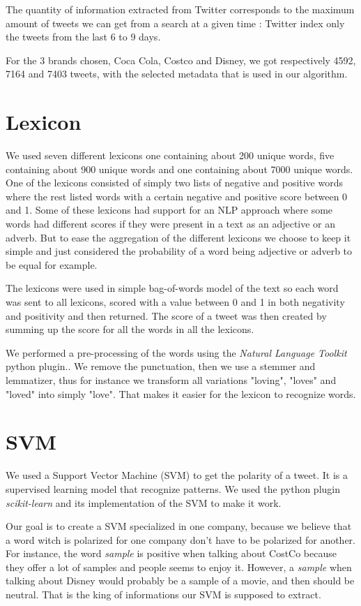 \documentclass[a4paper,12pt]{report}
\begin{document}
The quantity of information extracted from Twitter corresponds to the maximum amount of tweets we can get from a search at a given time : Twitter index only the tweets from the last 6 to 9 days.

For the 3 brands chosen, Coca Cola, Costco and Disney, we got respectively 4592, 7164 and 7403 tweets, with the selected metadata that is used in our algorithm.

\section{Lexicon}

We used seven different lexicons one containing about 200 unique words, five containing about 900 unique words and one containing about 7000 unique words.
One of the lexicons consisted of simply two lists of negative and positive words where the rest listed words with a certain negative and positive score between 0 and 1. 
Some of these lexicons had support for an NLP approach where some words had different scores if they were present in a text as an adjective or an adverb.  
But to ease the aggregation of the different lexicons we choose to keep it simple and just considered the probability of a word being adjective or adverb to be equal for example.

The lexicons were used in simple bag-of-words model of the text so each word was sent to all lexicons, scored with a value between 0 and 1 in both negativity and positivity and then returned. 
The score of a tweet was then created by summing up the score for all the words in all the lexicons.

We performed a pre-processing of the words using the \textit{Natural Language Toolkit} python plugin.\cite{NLTK}.
We remove the punctuation, then we use a stemmer and lemmatizer, thus for instance we transform all variations "loving", "loves" and "loved" into simply "love".
That makes it easier for the lexicon to recognize words.

\section{SVM}

We used a Support Vector Machine (SVM) to get the polarity of a tweet. It is a supervised learning model that recognize patterns. We used the python plugin \textit{scikit-learn}\cite{Scikit} and its implementation of the SVM to make it work.

Our goal is to create a SVM specialized in one company, because we believe that a word witch is polarized for one company don't have to be polarized for another.
For instance, the word \textit{sample} is positive when talking about CostCo because they offer a lot of samples and people seems to enjoy it. However, a \textit{sample} when talking about Disney would probably be a sample of a movie, and then should be neutral.
That is the king of informations our SVM is supposed to extract.
\end{document}
